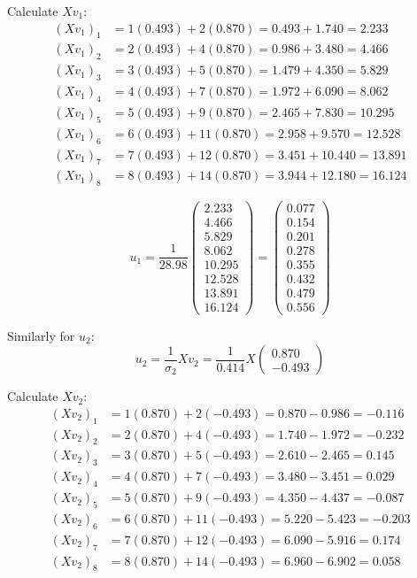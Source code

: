 \documentclass[12pt]{article}
\begin{document}
\begin{solution}
Calculate $Xv_1$:
\begin{align*}
(Xv_1)_1 &= 1(0.493) + 2(0.870) = 0.493 + 1.740 = 2.233 \\
(Xv_1)_2 &= 2(0.493) + 4(0.870) = 0.986 + 3.480 = 4.466 \\
(Xv_1)_3 &= 3(0.493) + 5(0.870) = 1.479 + 4.350 = 5.829 \\
(Xv_1)_4 &= 4(0.493) + 7(0.870) = 1.972 + 6.090 = 8.062 \\
(Xv_1)_5 &= 5(0.493) + 9(0.870) = 2.465 + 7.830 = 10.295 \\
(Xv_1)_6 &= 6(0.493) + 11(0.870) = 2.958 + 9.570 = 12.528 \\
(Xv_1)_7 &= 7(0.493) + 12(0.870) = 3.451 + 10.440 = 13.891 \\
(Xv_1)_8 &= 8(0.493) + 14(0.870) = 3.944 + 12.180 = 16.124
\end{align*}

\[
u_1 = \frac{1}{28.98} \begin{pmatrix}
2.233 \\
4.466 \\
5.829 \\
8.062 \\
10.295 \\
12.528 \\
13.891 \\
16.124
\end{pmatrix} = \begin{pmatrix}
0.077 \\
0.154 \\
0.201 \\
0.278 \\
0.355 \\
0.432 \\
0.479 \\
0.556
\end{pmatrix}
\]

Similarly for $u_2$:
\[
u_2 = \frac{1}{\sigma_2} Xv_2 = \frac{1}{0.414} X \begin{pmatrix}
0.870 \\
-0.493
\end{pmatrix}
\]

Calculate $Xv_2$:
\begin{align*}
(Xv_2)_1 &= 1(0.870) + 2(-0.493) = 0.870 - 0.986 = -0.116 \\
(Xv_2)_2 &= 2(0.870) + 4(-0.493) = 1.740 - 1.972 = -0.232 \\
(Xv_2)_3 &= 3(0.870) + 5(-0.493) = 2.610 - 2.465 = 0.145 \\
(Xv_2)_4 &= 4(0.870) + 7(-0.493) = 3.480 - 3.451 = 0.029 \\
(Xv_2)_5 &= 5(0.870) + 9(-0.493) = 4.350 - 4.437 = -0.087 \\
(Xv_2)_6 &= 6(0.870) + 11(-0.493) = 5.220 - 5.423 = -0.203 \\
(Xv_2)_7 &= 7(0.870) + 12(-0.493) = 6.090 - 5.916 = 0.174 \\
(Xv_2)_8 &= 8(0.870) + 14(-0.493) = 6.960 - 6.902 = 0.058
\end{align*}


\end{solution}
\end{document}
